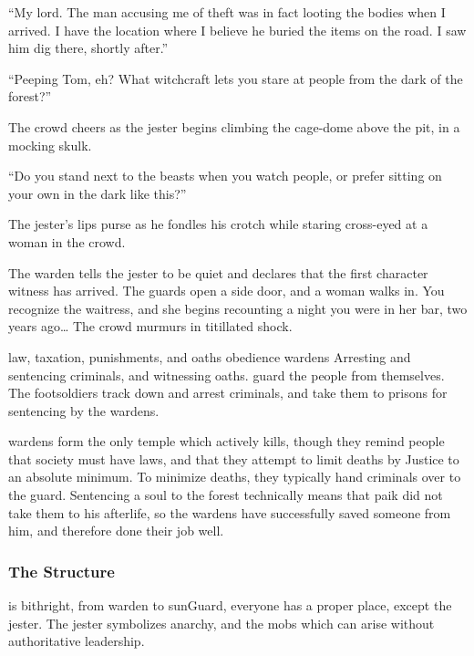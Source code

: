 \begin{multicols}{2}
{    ``My lord.
    The man accusing me of theft was in fact looting the bodies when I arrived.
    I have the location where I believe he buried the items on the road.
    I saw him dig there, shortly after.''

    {\sffamily ``Peeping Tom, eh?
    What witchcraft lets you stare at people from the dark of the forest?''}

    The crowd cheers as the jester begins climbing the cage-dome above the pit, in a mocking skulk.

    {\sffamily ``Do you stand next to the beasts when you watch people, or prefer sitting on your own in the dark like this?''}

    The jester's lips purse as he fondles his crotch while staring cross-eyed at a woman in the crowd.

    The \gls{warden} tells the jester to be quiet and declares that the first character witness has arrived.
    The guards open a side door, and a woman walks in.
    You recognize the waitress, and she begins recounting a night you were in her bar, two years ago\ldots
    The crowd murmurs in titillated shock.
  }%
  {law, taxation, punishments, and oaths}%
  {obedience}%
  {\Glspl{warden}}%
  {
    Arresting and sentencing criminals, and witnessing oaths.
  }%
guard the people from themselves.
The footsoldiers track down and arrest criminals, and take them to prisons for sentencing by the \glspl{warden}.

\Glspl{warden} form the only temple which actively kills, though they remind people that society must have laws, and that they attempt to limit deaths by Justice to an absolute minimum.
To minimize deaths, they typically hand criminals over to the \gls{guard}.
Sentencing a soul to the forest technically means that \gls{paik} did not take them to his afterlife, so the \glspl{warden} have successfully saved someone from him, and therefore done their job well.

\subsubsection{The Structure}
is bithright, from \gls{warden} to \gls{sunGuard}, everyone has a proper place, except the jester.
The jester symbolizes anarchy, and the mobs which can arise without authoritative leadership.


\end{multicols}
